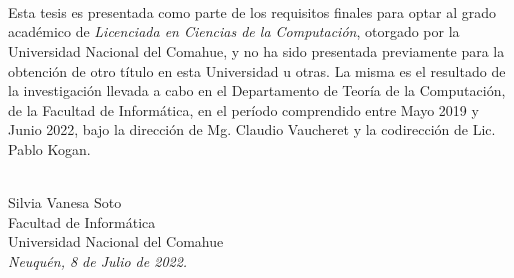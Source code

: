 \ \\
\ \\
\label{pagpref}
\\
\ \\
\ \\

\ \\

\ \\
\ \\


Esta tesis es presentada como parte de los requisitos finales para optar al grado acad\'emico de {\em Licenciada en Ciencias de la Computación}, otorgado por la Universidad Nacional del Comahue, y no ha sido presentada previamente para la obtención de otro título en esta Universidad u otras. La misma es el resultado de la investigación llevada a cabo en el Departamento de Teoría de la Computación, de la Facultad de Informática, en el período comprendido entre Mayo 2019 y Junio 2022, bajo la dirección de Mg. Claudio Vaucheret y la codirección de Lic. Pablo Kogan.
\vspace{3cm}


\ \\
{\flushright Silvia Vanesa Soto\\
{\sc Facultad de Informática \\
Universidad Nacional del Comahue}\\
{\em Neuqu\'en, 8 de Julio de 2022.}\\}

\vfill

